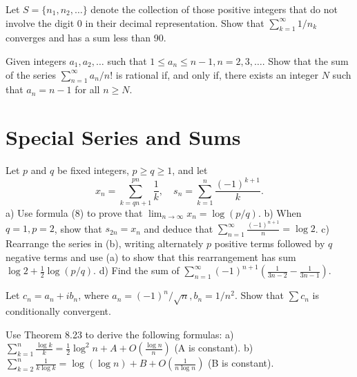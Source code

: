     \begin{problembox}
    Let \(S = \{n_1, n_2, \ldots\}\) denote the collection of those positive integers that do not involve the digit 0 in their decimal representation. Show that \(\sum_{k=1}^{\infty} 1/n_k\) converges and has a sum less than 90.
    \end{problembox}
    
    \begin{problembox}
    Given integers \(a_1, a_2, \ldots\) such that \(1 \leq a_n \leq n - 1, n = 2, 3, \ldots\). Show that the sum of the series \(\sum_{n=1}^{\infty} a_n / n!\) is rational if, and only if, there exists an integer \(N\) such that \(a_n = n - 1\) for all \(n \geq N\).
    \end{problembox}

\section{Special Series and Sums}

\begin{problembox}
    Let \(p\) and \(q\) be fixed integers, \(p \geq q \geq 1\), and let
    \[x_n = \sum_{k=qn+1}^{pn} \frac{1}{k}, \quad s_n = \sum_{k=1}^{n} \frac{(-1)^{k+1}}{k}.\]
    a) Use formula (8) to prove that \(\lim_{n \to \infty} x_n = \log(p/q)\). 
    b) When \(q = 1, p = 2\), show that \(s_{2n} = x_n\) and deduce that \(\sum_{n=1}^{\infty} \frac{(-1)^{n+1}}{n} = \log 2\).
    c) Rearrange the series in (b), writing alternately \(p\) positive terms followed by \(q\) negative terms and use (a) to show that this rearrangement has sum \(\log 2 + \frac{1}{2} \log(p/q)\).
    d) Find the sum of \(\sum_{n=1}^{\infty} (-1)^{n+1} \left( \frac{1}{3n - 2} - \frac{1}{3n - 1} \right)\).
    \end{problembox}
    
    \begin{problembox}
    Let \(c_n = a_n + ib_n\), where \(a_n = (-1)^n/\sqrt{n}, b_n = 1/n^2\). Show that \(\sum c_n\) is conditionally convergent.
    \end{problembox}
    
    \begin{problembox}
    Use Theorem 8.23 to derive the following formulas:
    a) \(\sum_{k=1}^{n} \frac{\log k}{k} = \frac{1}{2} \log^2 n + A + O \left( \frac{\log n}{n} \right)\) (A is constant).
    b) \(\sum_{k=2}^{n} \frac{1}{k \log k} = \log (\log n) + B + O \left( \frac{1}{n \log n} \right)\) (B is constant).
    \end{problembox}
    
